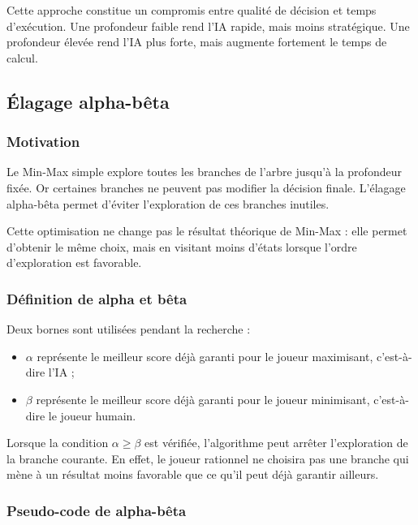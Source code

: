 \documentclass[12pt,a4paper]{article}
\begin{document}
Cette approche constitue un compromis entre qualité de décision et temps d'exécution. Une profondeur faible rend l'IA rapide, mais moins stratégique. Une profondeur élevée rend l'IA plus forte, mais augmente fortement le temps de calcul.


\subsection{Élagage alpha-bêta}

\subsubsection{Motivation}

Le Min-Max simple explore toutes les branches de l'arbre jusqu'à la profondeur fixée. Or certaines branches ne peuvent pas modifier la décision finale. L'élagage alpha-bêta permet d'éviter l'exploration de ces branches inutiles.

Cette optimisation ne change pas le résultat théorique de Min-Max : elle permet d'obtenir le même choix, mais en visitant moins d'états lorsque l'ordre d'exploration est favorable.

\subsubsection{Définition de alpha et bêta}

Deux bornes sont utilisées pendant la recherche :

\begin{itemize}[leftmargin=1.2cm]
    \item $\alpha$ représente le meilleur score déjà garanti pour le joueur maximisant, c'est-à-dire l'IA ;
    \item $\beta$ représente le meilleur score déjà garanti pour le joueur minimisant, c'est-à-dire le joueur humain.
\end{itemize}

Lorsque la condition $\alpha \geq \beta$ est vérifiée, l'algorithme peut arrêter l'exploration de la branche courante. En effet, le joueur rationnel ne choisira pas une branche qui mène à un résultat moins favorable que ce qu'il peut déjà garantir ailleurs.

\subsubsection{Pseudo-code de alpha-bêta}
\end{document}
